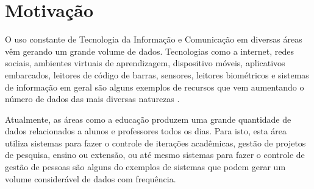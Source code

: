 \documentclass[diss-proposta,nocipinfo]{texufpel}
\begin{document}
\chapter{Motivação}





O uso constante de Tecnologia da Informação e Comunicação em diversas áreas vêm gerando um grande volume de dados. Tecnologias como a internet, redes sociais, ambientes virtuais de aprendizagem, dispositivo móveis, aplicativos embarcados, leitores de código de barras, sensores, leitores biométricos e sistemas de informação em geral são alguns exemplos de recursos que vem aumentando o número de dados das mais diversas naturezas \cite{goldschmidt2015data}.

Atualmente, as áreas como a educação produzem uma grande quantidade de dados relacionados a alunos e professores todos os dias. Para isto, esta área utiliza sistemas para fazer o controle de iterações acadêmicas, gestão de projetos de pesquisa, ensino ou extensão, ou até mesmo sistemas para fazer o controle de gestão de pessoas são alguns do exemplos de sistemas que podem gerar um volume considerável de dados com frequência.
\end{document}
